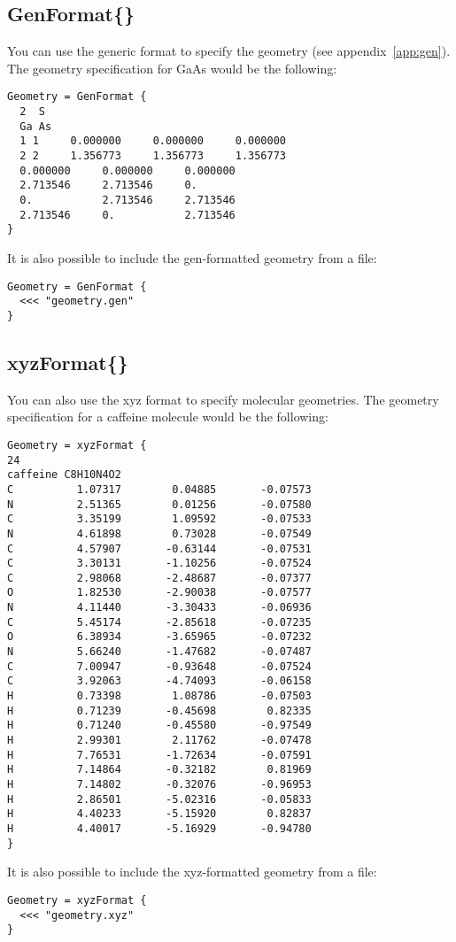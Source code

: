 \subsection{GenFormat\{\}}
\label{sec:dftbp.GenFormat}

You can use the generic format to specify the geometry (see
appendix~\ref{app:gen}). The geometry specification for GaAs would be
the following:
\begin{verbatim}
Geometry = GenFormat {
  2  S
  Ga As
  1 1     0.000000     0.000000     0.000000
  2 2     1.356773     1.356773     1.356773
  0.000000     0.000000     0.000000
  2.713546     2.713546     0.
  0.           2.713546     2.713546
  2.713546     0.           2.713546
}
\end{verbatim}
It is also possible to include the gen-formatted geometry from a file:
\begin{verbatim}
Geometry = GenFormat {
  <<< "geometry.gen"
}
\end{verbatim}

\subsection{xyzFormat\{\}}
\label{sec:dftbp.xyzFormat}

You can also use the xyz format to specify molecular geometries.
The geometry specification for a caffeine molecule would be the following:
\begin{verbatim}
Geometry = xyzFormat {
24
caffeine C8H10N4O2
C          1.07317        0.04885       -0.07573
N          2.51365        0.01256       -0.07580
C          3.35199        1.09592       -0.07533
N          4.61898        0.73028       -0.07549
C          4.57907       -0.63144       -0.07531
C          3.30131       -1.10256       -0.07524
C          2.98068       -2.48687       -0.07377
O          1.82530       -2.90038       -0.07577
N          4.11440       -3.30433       -0.06936
C          5.45174       -2.85618       -0.07235
O          6.38934       -3.65965       -0.07232
N          5.66240       -1.47682       -0.07487
C          7.00947       -0.93648       -0.07524
C          3.92063       -4.74093       -0.06158
H          0.73398        1.08786       -0.07503
H          0.71239       -0.45698        0.82335
H          0.71240       -0.45580       -0.97549
H          2.99301        2.11762       -0.07478
H          7.76531       -1.72634       -0.07591
H          7.14864       -0.32182        0.81969
H          7.14802       -0.32076       -0.96953
H          2.86501       -5.02316       -0.05833
H          4.40233       -5.15920        0.82837
H          4.40017       -5.16929       -0.94780
}
\end{verbatim}
It is also possible to include the xyz-formatted geometry from a file:
\begin{verbatim}
Geometry = xyzFormat {
  <<< "geometry.xyz"
}
\end{verbatim}

